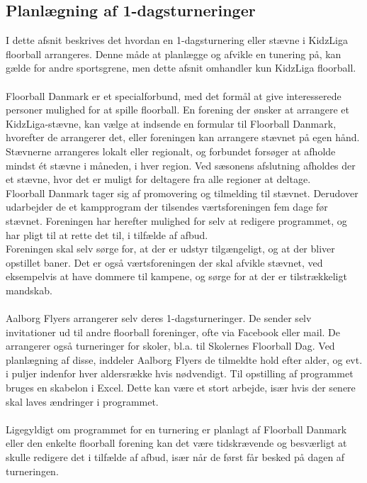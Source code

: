 \subsection*{Planlægning af 1-dagsturneringer}
I dette afsnit beskrives det hvordan en 1-dagsturnering eller stævne i KidzLiga floorball arrangeres. Denne måde at planlægge og afvikle en tunering på, kan gælde for andre sportsgrene, men dette afsnit omhandler kun KidzLiga floorball.
\\
\\
Floorball Danmark er et specialforbund, med det formål at give interesserede personer mulighed for at spille floorball. En forening der ønsker at arrangere et KidzLiga-stævne, kan vælge at indsende en formular til Floorball Danmark, hvorefter de arrangerer det, eller foreningen kan arrangere stævnet på egen hånd. Stævnerne arrangeres lokalt eller regionalt, og forbundet forsøger at afholde mindst ét stævne i måneden, i hver region. Ved sæsonens afslutning afholdes der et stævne, hvor det er muligt for deltagere fra alle regioner at deltage.\\
Floorball Danmark tager sig af promovering og tilmelding til stævnet. Derudover udarbejder de et kampprogram der tilsendes værtsforeningen fem dage før stævnet. Foreningen har herefter mulighed for selv at redigere programmet, og har pligt til at rette det til, i tilfælde af afbud.\\
Foreningen skal selv sørge for, at der er udstyr tilgængeligt, og at der bliver opstillet baner. Det er også værtsforeningen der skal afvikle stævnet, ved eksempelvis at have dommere til kampene, og sørge for at der er tilstrækkeligt mandskab\citep{kidzRegler}. 
\\\\
Aalborg Flyers arrangerer selv deres 1-dagsturneringer. De sender selv invitationer ud til andre floorball foreninger, ofte via Facebook eller mail. De arrangerer også turneringer for skoler, bl.a. til Skolernes Floorball Dag. Ved planlægning af disse, inddeler Aalborg Flyers de tilmeldte hold efter alder, og evt. i puljer indenfor hver aldersrække hvis nødvendigt. Til opstilling af programmet bruges en skabelon i Excel. Dette kan være et stort arbejde, især hvis der senere skal laves ændringer i programmet.
\\\\
Ligegyldigt om programmet for en turnering er planlagt af Floorball Danmark eller den enkelte floorball forening kan det være tidskrævende og besværligt at skulle redigere det i tilfælde af afbud, især når de først får besked på dagen af turneringen. 



